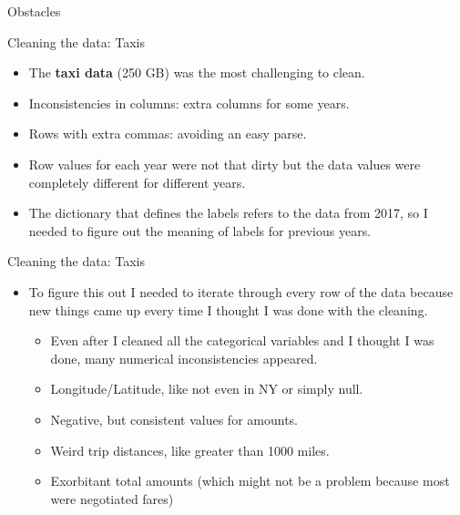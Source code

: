 \documentclass[10pt,ignorenonframetext,]{beamer}
\providecommand{\tightlist}{%
  \setlength{\itemsep}{0pt}\setlength{\parskip}{0pt}}
\begin{document}
\begin{frame}{%
\protect\hypertarget{obstacles}{%
Obstacles}}

\begin{block}{Cleaning the data: Taxis}

\begin{itemize}
\item
  The \textbf{taxi data} (250 GB) was the most challenging to clean.
\item
  Inconsistencies in columns: extra columns for some years.
\item
  Rows with extra commas: avoiding an easy parse.
\item
  Row values for each year were not that dirty but the data values were
  completely different for different years.
\item
  The dictionary that defines the labels refers to the data from 2017,
  so I needed to figure out the meaning of labels for previous years.
\end{itemize}

\end{block}

\end{frame}

\begin{frame}

\begin{block}{Cleaning the data: Taxis}

\begin{itemize}
\tightlist
\item
  To figure this out I needed to iterate through every row of the data
  because new things came up every time I thought I was done with the
  cleaning.

  \begin{itemize}
  \tightlist
  \item
    Even after I cleaned all the categorical variables and I thought I
    was done, many numerical inconsistencies appeared.
  \item
    Longitude/Latitude, like not even in NY or simply null.
  \item
    Negative, but consistent values for amounts.
  \item
    Weird trip distances, like greater than 1000 miles.
  \item
    Exorbitant total amounts (which might not be a problem because most
    were negotiated fares)
  \end{itemize}
\end{itemize}

\end{block}

\end{frame}
\end{document}
